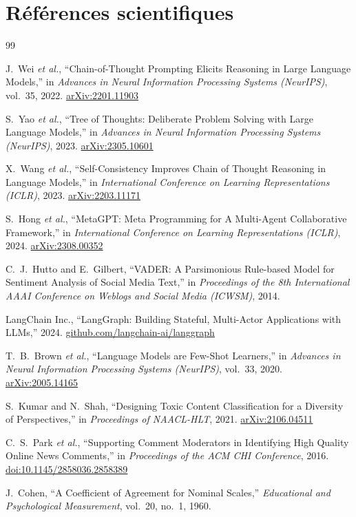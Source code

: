 \documentclass[12pt, a4paper]{article}
\begin{document}
\section{Références scientifiques}

\begin{thebibliography}{99}

J.~Wei \textit{et al.},
``Chain-of-Thought Prompting Elicits Reasoning in Large Language Models,''
in \textit{Advances in Neural Information Processing Systems (NeurIPS)},
vol.~35, 2022.
\href{https://arxiv.org/abs/2201.11903}{arXiv:2201.11903}

S.~Yao \textit{et al.},
``Tree of Thoughts: Deliberate Problem Solving with Large Language Models,''
in \textit{Advances in Neural Information Processing Systems (NeurIPS)},
2023.
\href{https://arxiv.org/abs/2305.10601}{arXiv:2305.10601}

X.~Wang \textit{et al.},
``Self-Consistency Improves Chain of Thought Reasoning in Language Models,''
in \textit{International Conference on Learning Representations (ICLR)},
2023.
\href{https://arxiv.org/abs/2203.11171}{arXiv:2203.11171}

S.~Hong \textit{et al.},
``MetaGPT: Meta Programming for A Multi-Agent Collaborative Framework,''
in \textit{International Conference on Learning Representations (ICLR)},
2024.
\href{https://arxiv.org/abs/2308.00352}{arXiv:2308.00352}

C.~J.~Hutto and E.~Gilbert,
``VADER: A Parsimonious Rule-based Model for Sentiment Analysis of Social
Media Text,''
in \textit{Proceedings of the 8th International AAAI Conference on Weblogs
and Social Media (ICWSM)}, 2014.

LangChain Inc.,
``LangGraph: Building Stateful, Multi-Actor Applications with LLMs,''
2024.
\href{https://github.com/langchain-ai/langgraph}{github.com/langchain-ai/langgraph}

T.~B.~Brown \textit{et al.},
``Language Models are Few-Shot Learners,''
in \textit{Advances in Neural Information Processing Systems (NeurIPS)},
vol.~33, 2020.
\href{https://arxiv.org/abs/2005.14165}{arXiv:2005.14165}

S.~Kumar and N.~Shah,
``Designing Toxic Content Classification for a Diversity of Perspectives,''
in \textit{Proceedings of NAACL-HLT}, 2021.
\href{https://arxiv.org/abs/2106.04511}{arXiv:2106.04511}

C.~S.~Park \textit{et al.},
``Supporting Comment Moderators in Identifying High Quality Online News
Comments,''
in \textit{Proceedings of the ACM CHI Conference}, 2016.
\href{https://dl.acm.org/doi/10.1145/2858036.2858389}{doi:10.1145/2858036.2858389}

J.~Cohen,
``A Coefficient of Agreement for Nominal Scales,''
\textit{Educational and Psychological Measurement}, vol.~20, no.~1, 1960.

\end{thebibliography}
\end{document}
